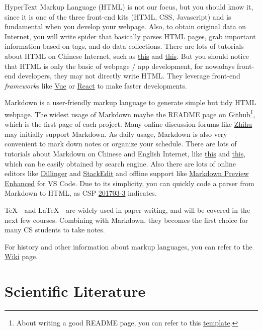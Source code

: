 \documentclass[english]{../TexTemplate/thesis}
\begin{document}
HyperText Markup Language (HTML) is not our focus, but you should know it, since it is one of the three front-end kits (HTML, CSS, Javascript) and is fundamental when you develop your webpage. 
Also, to obtain original data on Internet, you will write spider that basically parses HTML pages, grab important information based on tags, and do data collections.
There are lots of tutorials about HTML on Chinese Internet, such as \href{https://www.runoob.com/html/html-tutorial.html}{this} and \href{https://www.w3school.com.cn/html/html_getstarted.asp}{this}.
But you should notice that HTML is only the basic of webpage / app development, for nowadays front-end developers, they may not directly write HTML. They leverage front-end \emph{frameworks} like \href{https://cn.vuejs.org/}{Vue} or \href{https://reactjs.org/}{React} to make faster developments.

Markdown is a user-friendly markup language to generate simple but tidy HTML webpage. The widest usage of Markdown maybe the README page on Github\footnote{About writing a good README page, you can refer to this \href{https://gist.github.com/PurpleBooth/109311bb0361f32d87a2}{template}.}, which is the first page of each project. Many online discussion forums like \href{https://www.zhihu.com/}{Zhihu} may initially support Markdown. As daily usage, Markdown is also very convenient to mark down notes or organize your schedule.
There are lots of tutorials about Markdown on Chinese and English Internet, like \href{https://zhuanlan.zhihu.com/p/86516807}{this} and \href{https://www.markdowntutorial.com/}{this}, which can be easily obtained by search engine.
Also there are lots of online editors like \href{https://dillinger.io/}{Dillinger} and \href{https://stackedit.io/}{StackEdit} and offline support like \href{https://github.com/shd101wyy/vscode-markdown-preview-enhanced}{Markdown Preview Enhanced} for VS Code.
Due to its simplicity, you can quickly code a parser from Markdown to HTML, as CSP \href{http://118.190.20.162/view.page?gpid=T55}{201703-3} indicates.

\TeX~~and \LaTeX~~are widely used in paper writing, and will be covered in the next few courses. Combining with Markdown, they becomes the first choice for many CS students to take notes.

For history and other information about markup languages, you can refer to the \href{https://en.wikipedia.org/wiki/Markup_language}{Wiki} page.


\section{Scientific Literature}
\end{document}
